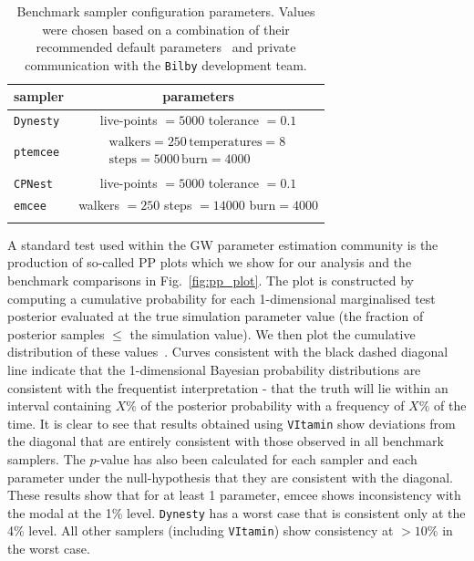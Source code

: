 \documentclass[%
showpacs,
nofootinbib,
 amsmath,amssymb,
 aps,
 twocolumn,
 prl,
 reprint,
floatfix,
]{revtex4-1}
\begin{document}
%
%
\begin{table}
\centering
\caption{Benchmark sampler configuration parameters. Values were chosen based
on a combination of their recommended default parameters~\cite{1811.02042} and
private communication with the \texttt{Bilby} development team. }
\begin{tabular}[t]{lc}
\toprule
sampler & parameters \\
\hline
\texttt{Dynesty}~\cite{dynesty} & live-points $=5000$ tolerance $=0.1$ \\
\texttt{ptemcee}~\cite{ptemcee} & $\begin{array}{c}\text{walkers}=250\,
\text{temperatures}=8\,
\\ \text{steps}=5000\, \text{burn}=4000\end{array}$ \\
\texttt{CPNest}~\cite{cpnest} & live-points $=5000$ tolerance $=0.1$ \\
\texttt{emcee}~\cite{emcee} & walkers $=250$ steps $=14000$ burn$=4000$ \\
\botrule
\end{tabular}
\label{Tab:sampler_params}
\end{table}

%
%
A standard test used within the \ac{GW} parameter estimation community is the
production of so-called \ac{PP} plots which we show for our analysis and
the benchmark comparisons in Fig.~\ref{fig:pp_plot}. The plot is constructed
by computing a cumulative probability for each 1-dimensional marginalised
test posterior evaluated at the true simulation parameter value (the fraction
of posterior samples $\leq$ the simulation value). We then plot the
cumulative distribution of these values~\cite{1409.7215}. Curves consistent
with the black dashed diagonal line indicate that the 1-dimensional Bayesian
probability distributions are consistent with the frequentist interpretation -
that the truth will lie within an interval containing $X\%$ of the posterior
probability with a frequency of $X\%$ of the time. It is clear to see that
results obtained using \texttt{VItamin} show deviations from the diagonal
that are entirely consistent with those observed in all benchmark samplers.
The $p$-value has also been calculated for each sampler and each parameter
under the null-hypothesis that they are consistent with the diagonal. These
results show that for at least 1 parameter, emcee shows inconsistency with the
modal at the 1\% level. \texttt{Dynesty} has a worst case that is consistent only at the
4\% level.  All other samplers (including \texttt{VItamin}) show consistency at
$>10\%$ in the worst case.    
\end{document}
